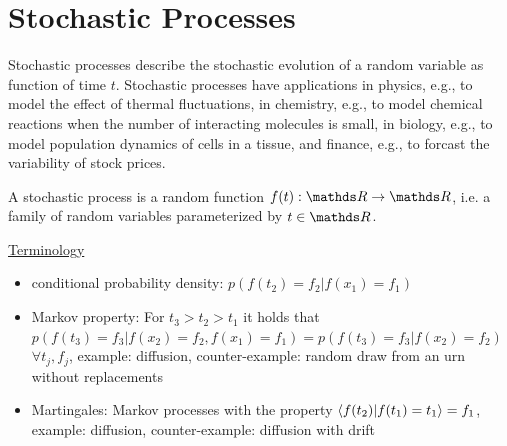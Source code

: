 \documentclass{notebook}
\begin{document}
\section{Stochastic Processes}
 
Stochastic processes describe the stochastic evolution of a random variable as function of time $t$.
Stochastic processes have applications 
in physics, e.g., to model the effect of thermal fluctuations, 
in chemistry, e.g., to model chemical reactions when the number of interacting molecules is small, 
in biology, e.g., to model population dynamics of cells in a tissue,
and finance, e.g., to forcast the variability of stock prices.
 
\begin{theorem}
	A stochastic process is a random function $f(t):\R \to \R$, 
	i.e. a family of random variables parameterized by $t \in \R$.
\end{theorem}

\underline{Terminology}

\begin{itemize}
	\item{conditional probability density: $p(f(t_2) = f_2 | f(x_1) = f_1)$}
	\item{Markov property: For $t_3 > t_2 > t_1$ it holds that $p(f(t_3) = f_3 | f(x_2) = f_2, f(x_1)=f_1) = p(f(t_3) = f_3 | f(x_2) = f_2)$ $\forall t_j, f_j$, example: diffusion, counter-example: random draw from an urn without replacements}
	\item{Martingales: Markov processes with the property $\expval{f(t_2) | f(t_1) = t_1} = f_1$, example: diffusion, counter-example: diffusion with drift}
\end{itemize}
\end{document}
